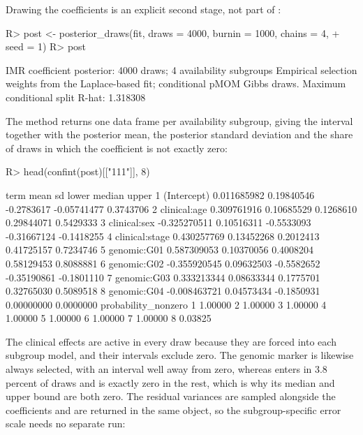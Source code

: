 \documentclass[article]{jss}
\begin{document}
{\color{blue}%
Drawing the coefficients is an explicit second stage, not part of
:

\begin{CodeChunk}
\begin{CodeInput}
R> post <- posterior_draws(fit, draws = 4000, burnin = 1000, chains = 4,
+    seed = 1)
R> post
\end{CodeInput}
\begin{CodeOutput}
IMR coefficient posterior: 4000 draws; 4 availability subgroups
Empirical selection weights from the Laplace-based fit; conditional pMOM Gibbs draws. 
Maximum conditional split R-hat: 1.318308 
\end{CodeOutput}
\end{CodeChunk}

The  method returns one data frame per availability subgroup,
giving the interval together with the posterior mean, the posterior standard
deviation and the share of draws in which the coefficient is not exactly zero:

\begin{CodeChunk}
\begin{CodeInput}
R> head(confint(post)[["111"]], 8)
\end{CodeInput}
\begin{CodeOutput}
            term         mean         sd      lower      median      upper
1    (Intercept)  0.011685982 0.19840546 -0.2783617 -0.05741477  0.3743706
2   clinical:age  0.309761916 0.10685529  0.1268610  0.29844071  0.5429333
3   clinical:sex -0.325270511 0.10516311 -0.5533093 -0.31667124 -0.1418255
4 clinical:stage  0.430257769 0.13452268  0.2012413  0.41725157  0.7234746
5    genomic:G01  0.587309053 0.10370056  0.4008204  0.58129453  0.8088881
6    genomic:G02 -0.355920545 0.09632503 -0.5582652 -0.35190861 -0.1801110
7    genomic:G03  0.333213344 0.08633344  0.1775701  0.32765030  0.5089518
8    genomic:G04 -0.008463721 0.04573434 -0.1850931  0.00000000  0.0000000
  probability_nonzero
1             1.00000
2             1.00000
3             1.00000
4             1.00000
5             1.00000
6             1.00000
7             1.00000
8             0.03825
\end{CodeOutput}
\end{CodeChunk}

The clinical effects are active in every draw because they are forced into each
subgroup model, and their intervals exclude zero. The genomic marker
 is likewise always selected, with an interval well away from zero,
whereas  enters in 3.8 percent of draws and is exactly zero in the
rest, which is why its median and upper bound are both zero. The residual
variances are sampled alongside the coefficients and are returned in the same
object, so the subgroup-specific error scale needs no separate run:

}
\end{document}
